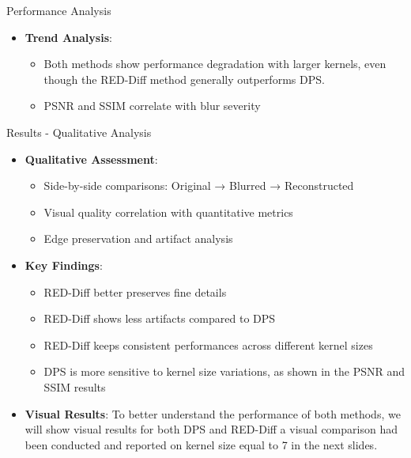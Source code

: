 \begin{frame}{Performance Analysis}
    \begin{itemize}
        \item \textbf{Trend Analysis}:
              \begin{itemize}
                  \item Both methods show performance degradation with larger kernels, even though the RED-Diff method generally outperforms DPS.
                  \item PSNR and SSIM correlate with blur severity
              \end{itemize}
    \end{itemize}
\end{frame}

\begin{frame}{Results - Qualitative Analysis}
\begin{itemize}
    \item \textbf{Qualitative Assessment}:
          \begin{itemize}
              \item Side-by-side comparisons: Original → Blurred → Reconstructed
              \item Visual quality correlation with quantitative metrics
              \item Edge preservation and artifact analysis
          \end{itemize}
    \item \textbf{Key Findings}:
          \begin{itemize}
              \item RED-Diff better preserves fine details
              \item RED-Diff shows less artifacts compared to DPS
              \item RED-Diff keeps consistent performances across different kernel sizes
              \item DPS is more sensitive to kernel size variations, as shown in the PSNR and SSIM results
          \end{itemize}

    \item \textbf{Visual Results}: To better understand the performance of both methods, we will show visual results for both DPS and RED-Diff a visual comparison had been conducted and reported on kernel size equal to 7 in the next slides.
\end{itemize}
\end{frame}

